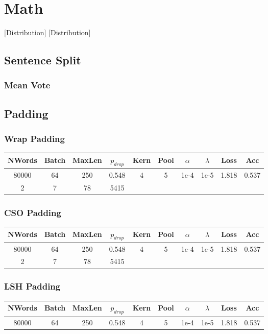 %
%
\section{Math}
[Distribution]
[Distribution]
\subsection{Sentence Split}
\subsubsection{Mean Vote}

\subsection{Padding}
\subsubsection{Wrap Padding}
\begin{center}\begin{tabular}{||c c c c c c c c c c ||}
 \hline
 NWords & Batch & MaxLen & $p_{drop}$ & Kern & Pool & $\alpha$ & $\lambda$ &  Loss & Acc\\ [0.5ex]
 \hline\hline
 80000 & 64 & 250 & 0.548 & 4 & 5 & 1e-4 & 1e-5 & 1.818 & 0.537\\
 \hline
 2 & 7 & 78 & 5415 \\
 [1ex]\hline\end{tabular}\end{center}

\subsubsection{CSO Padding}
\begin{center}\begin{tabular}{||c c c c c c c c c c ||}
 \hline
 NWords & Batch & MaxLen & $p_{drop}$ & Kern & Pool & $\alpha$ & $\lambda$ &  Loss & Acc\\ [0.5ex]
 \hline\hline
 80000 & 64 & 250 & 0.548 & 4 & 5 & 1e-4 & 1e-5 & 1.818 & 0.537\\
 \hline
 2 & 7 & 78 & 5415 \\
 [1ex]\hline\end{tabular}\end{center}
\subsubsection{LSH Padding}
\begin{center}\begin{tabular}{||c c c c c c c c c c ||}
 \hline
 NWords & Batch & MaxLen & $p_{drop}$ & Kern & Pool & $\alpha$ & $\lambda$ &  Loss & Acc\\ [0.5ex]
 \hline\hline
 80000 & 64 & 250 & 0.548 & 4 & 5 & 1e-4 & 1e-5 & 1.818 & 0.537\\
 [1ex]\hline\end{tabular}\end{center}

